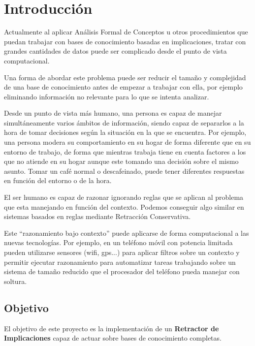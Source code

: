 
\chapter*{Introducción}


	Actualmente al aplicar Análisis Formal de Conceptos u otros procedimientos que puedan 
	trabajar con bases de conocimiento basadas en implicaciones, tratar con grandes cantidades 
	de datos puede ser complicado desde el punto de vista computacional.
	
	Una forma de abordar este problema puede ser reducir el tamaño y complejidad de una base 
	de conocimiento antes de empezar a trabajar con ella, por ejemplo eliminando información no 
	relevante para lo que se intenta analizar.   
	
	Desde un punto de vista más humano, una persona es capaz de manejar simultáneamente varios
	ámbitos de información, siendo capaz de separarlos a la hora de tomar decisiones según la 
	situación en la que se encuentra. Por ejemplo, una persona modera su comportamiento en su hogar
	de forma diferente que en su entorno de trabajo, de forma que mientras trabaja tiene en cuenta factores
	a los que no atiende en su hogar aunque este tomando una decisión sobre el mismo asunto. Tomar un café 
	normal o descafeinado, puede tener diferentes respuestas en función del entorno o de la hora.
	
	El ser humano es capaz de razonar ignorando reglas que se aplican al problema que esta manejando en función del contexto. Podemos conseguir
	algo similar en sistemas basados en reglas mediante Retracción Conservativa.
	
	Este ``razonamiento bajo contexto'' puede aplicarse de forma computacional a las nuevas tecnologías. Por ejemplo, en un teléfono móvil con potencia limitada pueden utilizarse sensores (wifi, gps...) para aplicar filtros sobre un contexto y permitir ejecutar razonamiento para automatizar tareas trabajando sobre un sistema de tamaño reducido que el procesador del teléfono pueda manejar con soltura.
	
 
\section*{Objetivo}

	El objetivo de este proyecto es la implementación de un \textbf{Retractor de Implicaciones} capaz de actuar sobre bases
	de conocimiento completas.
	
